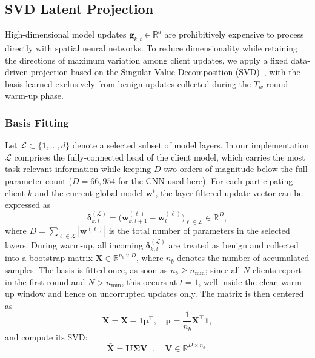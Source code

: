 \documentclass[journal]{IEEEtran}
\begin{document}
\subsection{SVD Latent Projection}

High-dimensional model updates $\mathbf{g}_{k,t} \in \mathbb{R}^d$ are prohibitively expensive to process directly with spatial neural networks. To reduce dimensionality while retaining the directions of maximum variation among client updates, we apply a fixed data-driven projection based on the Singular Value Decomposition (SVD)~\cite{zhang2015singular}, with the basis learned exclusively from benign updates collected during the $T_w$-round warm-up phase.

\subsubsection{Basis Fitting}
Let $\mathcal{L} \subset \{1, \ldots, d\}$ denote a selected subset of model layers. In our implementation $\mathcal{L}$ comprises the fully-connected head of the client model, which carries the most task-relevant information while keeping $D$ two orders of magnitude below the full parameter count ($D = 66{,}954$ for the CNN used here). For each participating client $k$ and the current global model $\mathbf{w}^t$, the layer-filtered update vector can be expressed as
\begin{equation}
\boldsymbol{\delta}_{k,t}^{(\mathcal{L})} = \bigl(\mathbf{w}_{k,t+1}^{(\ell)} - \mathbf{w}_t^{(\ell)}\bigr)_{\ell \in \mathcal{L}} \in \mathbb{R}^D,
\label{eq:layer_update}
\end{equation}
where $D = \sum_{\ell \in \mathcal{L}} |\mathbf{w}^{(\ell)}|$ is the total number of parameters in the selected layers. During warm-up, all incoming $\boldsymbol{\delta}_{k,t}^{(\mathcal{L})}$ are treated as benign and collected into a bootstrap matrix $\mathbf{X} \in \mathbb{R}^{n_b \times D}$, where $n_b$ denotes the number of accumulated samples. The basis is fitted once, as soon as $n_b \geq n_{\min}$; since all $N$ clients report in the first round and $N > n_{\min}$, this occurs at $t = 1$, well inside the clean warm-up window and hence on uncorrupted updates only. The matrix is then centered as
\begin{equation}
\bar{\mathbf{X}} = \mathbf{X} - \mathbf{1}\boldsymbol{\mu}^\top, \quad \boldsymbol{\mu} = \frac{1}{n_b} \mathbf{X}^\top \mathbf{1},
\label{eq:centering}
\end{equation}
and compute its SVD:
\begin{equation}
\bar{\mathbf{X}} = \mathbf{U} \boldsymbol{\Sigma} \mathbf{V}^\top, \quad \mathbf{V} \in \mathbb{R}^{D \times n_b}.
\label{eq:svd}
\end{equation}
\end{document}
